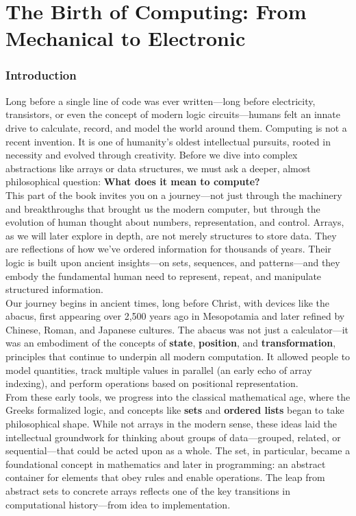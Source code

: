 \documentclass[12pt, oneside, openany]{book}
\begin{document}
	\tableofcontents
	\renewcommand{\arraystretch}{1.5} %
\mainmatter

\part{The Birth of Computing: From Mechanical to Electronic}

\section*{Introduction}

Long before a single line of code was ever written—long before electricity, transistors, or even the concept of modern logic circuits—humans felt an innate drive to calculate, record, and model the world around them. Computing is not a recent invention. It is one of humanity’s oldest intellectual pursuits, rooted in necessity and evolved through creativity. Before we dive into complex abstractions like arrays or data structures, we must ask a deeper, almost philosophical question: \textbf{What does it mean to compute?}\\
This part of the book invites you on a journey—not just through the machinery and breakthroughs that brought us the modern computer, but through the evolution of human thought about numbers, representation, and control. Arrays, as we will later explore in depth, are not merely structures to store data. They are reflections of how we’ve ordered information for thousands of years. Their logic is built upon ancient insights—on sets, sequences, and patterns—and they embody the fundamental human need to represent, repeat, and manipulate structured information.\\
Our journey begins in ancient times, long before Christ, with devices like the abacus, first appearing over 2,500 years ago in Mesopotamia and later refined by Chinese, Roman, and Japanese cultures. The abacus was not just a calculator—it was an embodiment of the concepts of \textbf{state}, \textbf{position}, and \textbf{transformation}, principles that continue to underpin all modern computation. It allowed people to model quantities, track multiple values in parallel (an early echo of array indexing), and perform operations based on positional representation.\\
From these early tools, we progress into the classical mathematical age, where the Greeks formalized logic, and concepts like \textbf{sets} and \textbf{ordered lists} began to take philosophical shape. While not arrays in the modern sense, these ideas laid the intellectual groundwork for thinking about groups of data—grouped, related, or sequential—that could be acted upon as a whole. The set, in particular, became a foundational concept in mathematics and later in programming: an abstract container for elements that obey rules and enable operations. The leap from abstract sets to concrete arrays reflects one of the key transitions in computational history—from idea to implementation.\\
\end{document}
